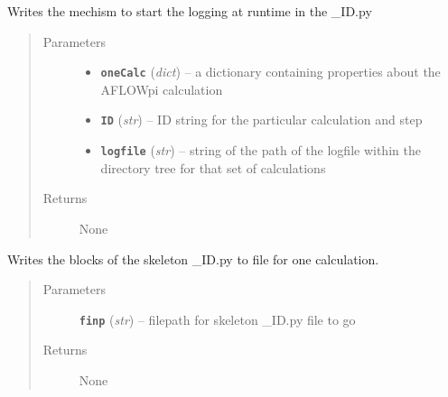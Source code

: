 \documentclass[letterpaper,10pt,english]{sphinxmanual}
\begin{document}

\begin{fulllineitems}
\label{prep:prep.__writeLoggingBlock}
Writes the mechism to start the logging at runtime in the \_ID.py
\begin{quote}\begin{description}
\item[{Parameters}] \leavevmode\begin{itemize}
\item {} 
\textbf{\texttt{oneCalc}} (\emph{dict}) -- a dictionary containing properties about the AFLOWpi calculation

\item {} 
\textbf{\texttt{ID}} (\emph{str}) -- ID string for the particular calculation and step

\item {} 
\textbf{\texttt{logfile}} (\emph{str}) -- string of the path of the logfile within the directory tree for that set of calculations

\end{itemize}

\item[{Returns}] \leavevmode
None

\end{description}\end{quote}

\end{fulllineitems}


\begin{fulllineitems}
\label{prep:prep.__writeTemplate}
Writes the blocks of the skeleton \_ID.py to file for one calculation.
\begin{quote}\begin{description}
\item[{Parameters}] \leavevmode
\textbf{\texttt{finp}} (\emph{str}) -- filepath for skeleton \_ID.py file to go

\item[{Returns}] \leavevmode
None

\end{description}\end{quote}

\end{fulllineitems}
\end{document}
